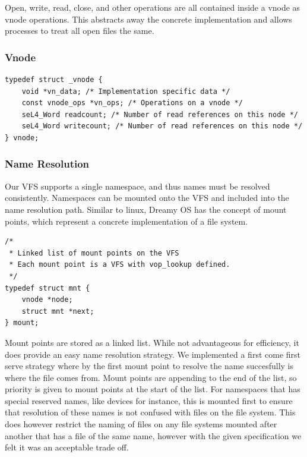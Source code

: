 \documentclass[runningheads,a4paper]{llncs}
\begin{document}
Open, write, read, close, and other operations are all contained inside a vnode as vnode operations. This abstracts away the concrete implementation and allows processes to treat all open files the same.

\subsubsection{Vnode}

\begin{lstlisting}[style=CStyle]
typedef struct _vnode {
    void *vn_data; /* Implementation specific data */
    const vnode_ops *vn_ops; /* Operations on a vnode */
    seL4_Word readcount; /* Number of read references on this node */
    seL4_Word writecount; /* Number of read references on this node */
} vnode;
\end{lstlisting}

\subsubsection{Name Resolution}

Our VFS supports a single namespace, and thus names must be resolved consistently. Namespaces can be mounted onto the VFS and included into the name resolution path. Similar to linux, Dreamy OS has the concept of mount points, which represent a concrete implementation of a file system.

\begin{lstlisting}[style=CStyle]
/*
 * Linked list of mount points on the VFS
 * Each mount point is a VFS with vop_lookup defined.
 */
typedef struct mnt {
    vnode *node;
    struct mnt *next;
} mount;
\end{lstlisting}

Mount points are stored as a linked list. While not advantageous for efficiency, it does provide an easy name resolution strategy. We implemented a first come first serve strategy where by the first mount point to resolve the name succesfully is where the file comes from. Mount points are appending to the end of the list, so priority is given to mount points at the start of the list. For namespaces that has special reserved names, like devices for instance, this is mounted first to ensure that resolution of these names is not confused with files on the file system. This does however restrict the naming of files on any file systems mounted after another that has a file of the same name, however with the given specification we felt it was an acceptable trade off.
\end{document}
